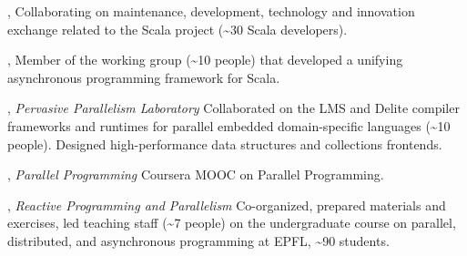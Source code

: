 \documentclass[9pt]{article}
\begin{document}
,
\newline\noindent Collaborating on maintenance, development, technology and innovation
\newline\noindent exchange related to the  Scala project
                  (\textasciitilde30 Scala developers).
\medskip

,
\newline\noindent Member of the working group (\textasciitilde10 people) that developed
                  a unifying
\newline\noindent asynchronous programming framework for Scala.
\medskip

,
\newline\noindent
{\em Pervasive Parallelism Laboratory}
\dates{}
\newline\noindent Collaborated on the LMS and Delite compiler frameworks and runtimes
\newline\noindent for parallel embedded domain-specific languages
                  (\textasciitilde10 people). Designed
\newline\noindent high-performance data structures and collections frontends.
\medskip


\medskip
{}

,
{\em Parallel Programming}
\newline\noindent Coursera MOOC on Parallel Programming.
\bigskip

,
{\em Reactive Programming and Parallelism}
\newline\noindent Co-organized, prepared materials and exercises, led teaching staff
                  (\textasciitilde7 people)
\newline\noindent on the undergraduate course on parallel, distributed, and asynchronous
\newline\noindent programming at EPFL, \textasciitilde90 students.
\bigskip
\end{document}
